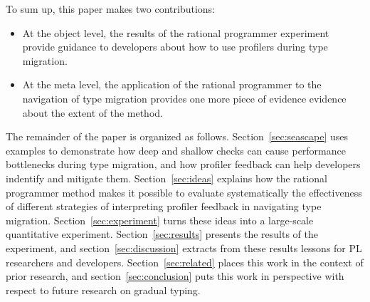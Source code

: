 To sum up, this paper makes two contributions:

\begin{itemize}
  \item At the object level, the results of the rational programmer
    experiment provide guidance to developers about how to use profilers
    during type migration.  
  \item At the meta level, the application of the rational programmer to
    the navigation of type migration provides one more piece of evidence evidence 
    about the extent of the method. 
\end{itemize}    

The remainder of the paper is organized as follows.
Section~\ref{sec:seascape} uses examples to demonstrate how deep
and shallow checks can cause performance bottlenecks during type migration, and how 
profiler feedback
can help developers indentify and mitigate them.  
Section~\ref{sec:ideas} explains how the rational programmer method 
makes it possible to evaluate systematically the effectiveness of
different strategies of interpreting profiler feedback in 
navigating type migration. Section~\ref{sec:experiment} turns these
ideas into a large-scale quantitative experiment. 
Section~\ref{sec:results} presents the results of the experiment, and 
section~\ref{sec:discussion} extracts from these results lessons for PL
researchers and developers. 
Section~\ref{sec:related} places this work in the context of prior
research, and section~\ref{sec:conclusion} puts this work in perspective
with respect to future research on gradual typing. 
